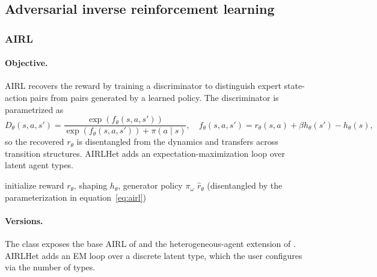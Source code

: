 \subsection{Adversarial inverse reinforcement learning}

\subsubsection{AIRL}

\paragraph{Objective.} AIRL \citep{fu2018} recovers the reward by training a discriminator to distinguish expert state-action pairs from pairs generated by a learned policy. The discriminator is parametrized as
\begin{equation}
D_\theta(s, a, s') = \frac{\exp(f_\theta(s, a, s'))}{\exp(f_\theta(s, a, s')) + \pi(a \mid s)},
\quad f_\theta(s, a, s') = r_\theta(s, a) + \beta h_\theta(s') - h_\theta(s),
\label{eq:airl}
\end{equation}
so the recovered $r_\theta$ is disentangled from the dynamics and transfers across transition structures. AIRLHet \citep{lee2026airlhet} adds an expectation-maximization loop over latent agent types.

\begin{algorithm}[H]
\SetAlgoLined
initialize reward $r_\theta$, shaping $h_\theta$, generator policy $\pi_\omega$\;
\Return $\hat r_\theta$ \quad (disentangled by the parameterization in equation~\eqref{eq:airl})\;
\caption{Adversarial IRL}
\end{algorithm}

\paragraph{Versions.} The  class exposes the base AIRL of \citet{fu2018} and the heterogeneous-agent extension  of \citet{lee2026airlhet}. AIRLHet adds an EM loop over a discrete latent type, which the user configures via the number of types.

